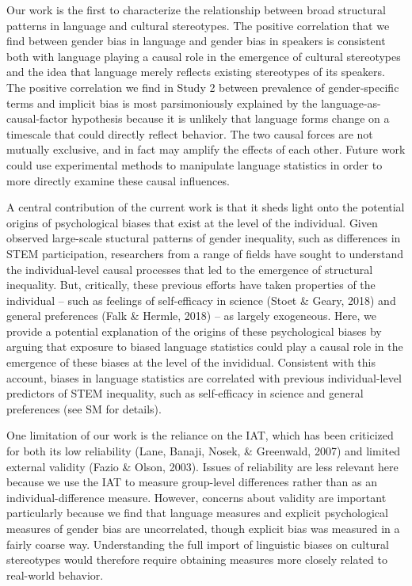\documentclass[man,floatsintext]{apa6}
\begin{document}
Our work is the first to characterize the relationship between broad structural patterns in language and cultural stereotypes. The positive correlation that we find between gender bias in language and gender bias in speakers is consistent both with language playing a causal role in the emergence of cultural stereotypes and the idea that language merely reflects existing stereotypes of its speakers. The positive correlation we find in Study 2 between prevalence of gender-specific terms and implicit bias is most parsimoniously explained by the language-as-causal-factor hypothesis because it is unlikely that language forms change on a timescale that could directly reflect behavior. The two causal forces are not mutually exclusive, and in fact may amplify the effects of each other. Future work could use experimental methods to manipulate language statistics in order to more directly examine these causal influences.

A central contribution of the current work is that it sheds light onto the potential origins of psychological biases that exist at the level of the individual. Given observed large-scale stuctural patterns of gender inequality, such as differences in STEM participation, researchers from a range of fields have sought to understand the individual-level causal processes that led to the emergence of structural inequality. But, critically, these previous efforts have taken properties of the individual -- such as feelings of self-efficacy in science (Stoet \& Geary, 2018) and general preferences (Falk \& Hermle, 2018) -- as largely exogeneous. Here, we provide a potential explanation of the origins of these psychological biases by arguing that exposure to biased language statistics could play a causal role in the emergence of these biases at the level of the invididual. Consistent with this account, biases in language statistics are correlated with previous individual-level predictors of STEM inequality, such as self-efficacy in science and general preferences (see SM for details).

One limitation of our work is the reliance on the IAT, which has been criticized for both its low reliability (Lane, Banaji, Nosek, \& Greenwald, 2007) and limited external validity (Fazio \& Olson, 2003). Issues of reliability are less relevant here because we use the IAT to measure group-level differences rather than as an individual-difference measure. However, concerns about validity are important particularly because we find that language measures and explicit psychological measures of gender bias are uncorrelated, though explicit bias was measured in a fairly coarse way. Understanding the full import of linguistic biases on cultural stereotypes would therefore require obtaining measures more closely related to real-world behavior.
\end{document}
